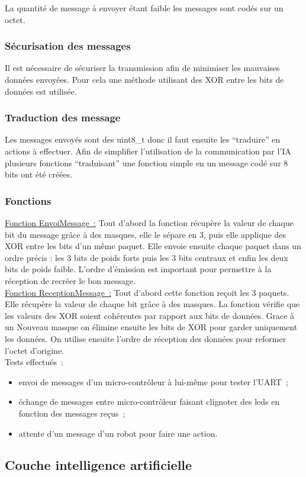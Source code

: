 \documentclass{article}
\begin{document}
La quantité de message à envoyer étant faible les messages sont codés sur un octet.

\subsubsection{Sécurisation des messages}

Il est nécessaire de sécuriser la transmission afin de minimiser les mauvaises données envoyées. Pour cela une méthode utilisant des XOR entre les bits de données est utilisée.

\subsubsection{Traduction des message}

Les messages envoyés sont des uint8\_t donc il faut ensuite les ``traduire'' en actions à effectuer. Afin de simplifier l'utilisation de la communication par l'IA plusieurs fonctions ``traduisant'' une fonction simple en un message codé sur 8 bits ont été créées.

\subsubsection{Fonctions}

\underline{Fonction EnvoiMessage~:} Tout d'abord la fonction récupère la valeur de chaque bit du message grâce à des masques, elle le sépare en 3, puis elle applique des XOR entre les bits d'un même paquet. Elle envoie ensuite chaque paquet dans un ordre précis : les 3 bits de poids forts puis les 3 bits centraux et enfin les deux bits de poids faible. L'ordre d'émission est important pour permettre à la réception de recréer le bon message. \\

\underline{Fonction ReceptionMessage~:} Tout d'abord cette fonction reçoit les 3 paquets. Elle récupère la valeur de chaque bit grâce à des masques. La fonction vérifie que les valeurs des XOR soient cohérentes par rapport aux bits de données. Grace à un Nouveau masque on élimine ensuite les bits de XOR pour garder uniquement les données. On utilise ensuite l'ordre de réception des données pour reformer l'octet d'origine. \\

Tests effectués~:
\begin{itemize}
  \item envoi de messages d'un micro-contrôleur à lui-même pour tester l'UART~;
  \item échange de messages entre micro-contrôleur faisant clignoter des leds en fonction des messages reçus~;
  \item attente d'un message d'un robot pour faire une action.
\end{itemize}

\subsection{Couche intelligence artificielle}
\end{document}
